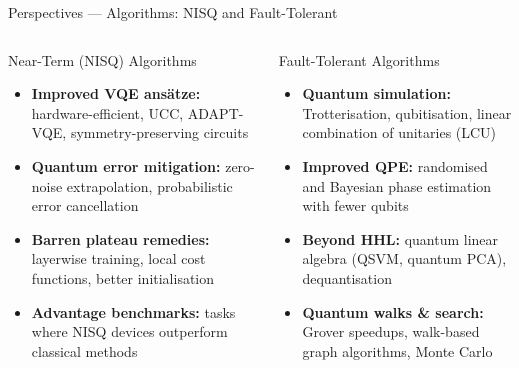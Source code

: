 \documentclass[aspectratio=169,10pt]{beamer}
\begin{document}
\begin{frame}{Perspectives --- Algorithms: NISQ and Fault-Tolerant}
  \begin{columns}[T]
      \begin{block}{Near-Term (NISQ) Algorithms}
        \begin{itemize}\footnotesize\itemsep1pt
          \item \textbf{Improved VQE ans\"{a}tze:}
                hardware-efficient, UCC, ADAPT-VQE,
                symmetry-preserving circuits
          \item \textbf{Quantum error mitigation:}
                zero-noise extrapolation,
                probabilistic error cancellation
          \item \textbf{Barren plateau remedies:}
                layerwise training, local cost
                functions, better initialisation
          \item \textbf{Advantage benchmarks:}
                tasks where NISQ devices
                outperform classical methods
        \end{itemize}
      \end{block}
      \begin{block}{Fault-Tolerant Algorithms}
        \begin{itemize}\footnotesize\itemsep1pt
          \item \textbf{Quantum simulation:}
                Trotterisation, qubitisation,
                linear combination of unitaries (LCU)
          \item \textbf{Improved QPE:}
                randomised and Bayesian phase
                estimation with fewer qubits
          \item \textbf{Beyond HHL:}
                quantum linear algebra (QSVM,
                quantum PCA), dequantisation
          \item \textbf{Quantum walks \& search:}
                Grover speedups, walk-based
                graph algorithms, Monte Carlo
        \end{itemize}
      \end{block}
  \end{columns}
\end{frame}
\end{document}
